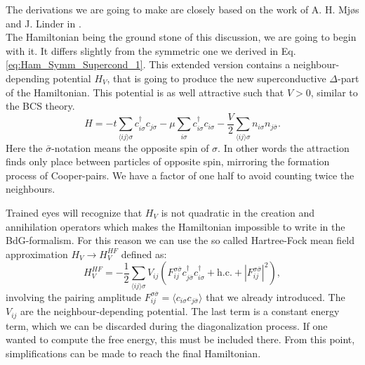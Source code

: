 \documentclass[../main.tex]{subfile}
\begin{document}
The derivations we are going to make are closely based on the work of A. H. Mjøs and J. Linder in \cite{Mjos2019}.\\

The Hamiltonian being the ground stone of this 
discussion, we are going to begin with it. It differs slightly from the symmetric one we derived in Eq. \ref{eq:Ham_Symm_Supercond_1}. This extended version contains a neighbour-depending potential 
$H_V$, that is going to 
produce the new superconductive $\Delta$-part of the Hamiltonian. This potential is as well attractive such that $V>0$, similar to the BCS theory.
\begin{equation}
    H = -t\sum_{\langle ij\rangle \sigma} c_{i\sigma}^{\dagger}c_{j\sigma} - \mu \sum_{i\sigma} c_{i\sigma}^{\dagger}c_{i\sigma} - \frac{V}{2} \sum_{\langle ij\rangle \sigma} n_{i\sigma}n_{j\bar{\sigma}}.
\end{equation}
Here the $\bar{\sigma}$-notation means the opposite spin of $\sigma$. In other words the attraction finds only place between particles of opposite spin,
 mirroring the formation process of Cooper-pairs.
We have a factor of one half to avoid counting twice the neighbours.

Trained eyes will recognize that $H_V$ is not quadratic in the creation and annihilation operators which makes the Hamiltonian impossible to write in the BdG-formalism. For this reason we can 
use the so called Hartree-Fock mean field approximation $H_V \rightarrow H^{HF}_V$ defined as:
\begin{equation}
    H^{HF}_V = -\frac{1}{2} \sum_{\langle ij\rangle \sigma} V_{ij} \left(F_{ij}^{\sigma \bar{\sigma}} c^{\dagger}_{j\bar{\sigma}}c^{\dagger}_{i\sigma} + \text{h.c.} 
    + |F_{ij}^{\sigma \bar{\sigma}}|^2\right),
\end{equation}
involving the pairing amplitude $F_{ij}^{\sigma \bar{\sigma}} = \langle c_{i\sigma}c_{j\bar{\sigma}}\rangle$ that we already introduced. The $V_{ij}$ are the neighbour-depending potential.
The last term is a constant energy term, which we can be discarded during the diagonalization process. If one wanted to compute the free energy, this must be included there.
From this point, simplifications can be made to reach the final Hamiltonian.
\end{document}
